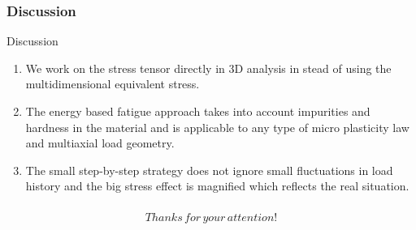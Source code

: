 \documentclass[xcolor=table]{Bredelebeamer}
\begin{document}
\begin{frame}
	\frametitle{Discussion}	
		\begin{exampleblock}{Discussion}
\begin{enumerate}
	\item We work on the stress tensor directly in 3D analysis in stead of using the multidimensional equivalent stress.
	
	\vspace{6pt}
	\item   The energy based fatigue approach takes into account impurities and hardness in the material and is applicable to any type of micro plasticity law and multiaxial load geometry.
	
	\vspace{6pt}
	\item The small step-by-step strategy does not ignore small fluctuations in load history and the big stress effect is magnified which reflects the real situation.
	
\end{enumerate}
\end{exampleblock}
\end{frame}	


\begin{frame}
	\frametitle{}	
	\begin{exampleblock}{}
		{
			\Huge $$Thanks \, for \, your \, attention!$$
		}	  
	\end{exampleblock}
\end{frame}			
\end{document}
